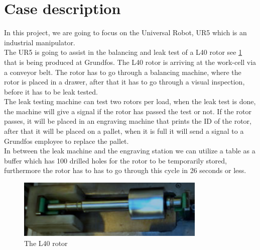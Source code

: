 \section{Case description} \label{ch:case description}

In this project, we are going to focus on the Universal Robot, UR5 which is an industrial manipulator.\\
The UR5 is going to assist in the balancing and leak test of a L40 rotor see \ref{fig:rotor} that is being produced at Grundfos. The L40 rotor is arriving at the work-cell via a conveyor belt. The rotor has to go through a balancing machine, where the rotor is placed in a drawer, after that it has to go through a visual inspection, before it has to be leak tested.\\
The leak testing machine can test two rotors per load, when the leak test is done, the machine will give a signal if the rotor has passed the test or not. If the rotor passes, it will be placed in an engraving machine that prints the ID of the rotor, after that it will be placed on a pallet, when it is full it will send a signal to a Grundfos employee to replace the pallet.\\ 
In between the leak machine and the engraving station we can utilize a table as a buffer which has 100 drilled holes for the rotor to be temporarily stored, furthermore the rotor has to has to go through this cycle in 26 seconds or less.\\
    

\begin{figure}
    \centering
    \includegraphics[width=9cm]{InitialProblemstatement/Case/rotorlille.PNG}
    \caption{The L40 rotor \cite{Case}}
    \label{fig:rotor}
\end{figure}




